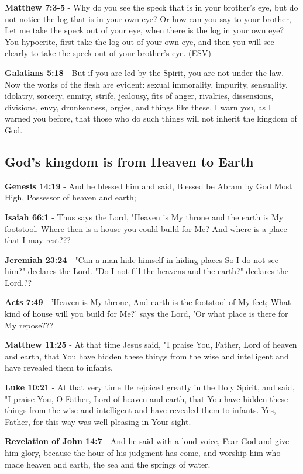 \documentclass[11pt]{article}
\begin{document}
\textbf{Matthew 7:3-5} - Why do you see the speck that is in your brother's eye, but do not notice the log that is in your own eye? Or how can you say to your brother, Let me take the speck out of your eye, when there is the log in your own eye? You hypocrite, first take the log out of your own eye, and then you will see clearly to take the speck out of your brother's eye. (ESV)

\textbf{Galatians 5:18} - But if you are led by the Spirit, you are not under the law. Now the works of the flesh are evident: sexual immorality, impurity, sensuality, idolatry, sorcery, enmity, strife, jealousy, fits of anger, rivalries, dissensions, divisions, envy, drunkenness, orgies, and things like these. I warn you, as I warned you before, that those who do such things will not inherit the kingdom of God.

\subsection{God's kingdom is from Heaven to Earth}
\label{sec:orge093a7f}
\textbf{Genesis 14:19} - And he blessed him and said, Blessed be Abram by God Most High, Possessor of heaven and earth;

\textbf{Isaiah 66:1} - Thus says the Lord, "Heaven is My throne and the earth is My footstool. Where then is a house you could build for Me? And where is a place that I may rest???

\textbf{Jeremiah 23:24} - "Can a man hide himself in hiding places So I do not see him?" declares the Lord. "Do I not fill the heavens and the earth?" declares the Lord.??

\textbf{Acts 7:49} - 'Heaven is My throne, And earth is the footstool of My feet; What kind of house will you build for Me?' says the Lord, 'Or what place is there for My repose???

\textbf{Matthew 11:25} - At that time Jesus said, "I praise You, Father, Lord of heaven and earth, that You have hidden these things from the wise and intelligent and have revealed them to infants.

\textbf{Luke 10:21} - At that very time He rejoiced greatly in the Holy Spirit, and said, "I praise You, O Father, Lord of heaven and earth, that You have hidden these things from the wise and intelligent and have revealed them to infants. Yes, Father, for this way was well-pleasing in Your sight.

\textbf{Revelation of John 14:7} - And he said with a loud voice, Fear God and give him glory, because the hour of his judgment has come, and worship him who made heaven and earth, the sea and the springs of water.
\end{document}
